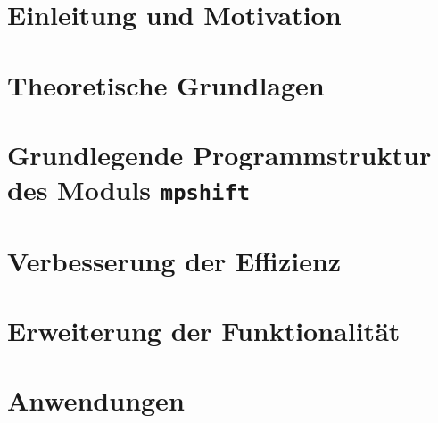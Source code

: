 \documentclass[
  paper=A4, 		%
  pagesize, 		%
  DIV=12, 		%
  ngerman,  		%
  12pt, 			%
  listof=totoc, 
  bibliography=totoc, 
  index=totoc, 
  openany, 
]{scrbook}
\begin{document}
\newcommand{\iu}{\mathrm{i}\mkern1mu}
\newcommand*\diff{\mathop{}\!\mathrm{d}}
\newcommand*\Diff[1]{\mathop{}\!\mathrm{d^#1}}

\frontmatter
 
\restoregeometry
\thispagestyle{empty}
\cleardoublepage

%  



\setcounter{secnumdepth}{5}
\setcounter{tocdepth}{5}
\tableofcontents

\mainmatter %

\chapter{Einleitung und Motivation}\label{einleitung}


\chapter{Theoretische Grundlagen}\label{theorie}


\chapter{Grundlegende Programmstruktur des Moduls \texttt{mpshift}}\label{programmstruktur}


\chapter{Verbesserung der Effizienz}\label{effizienz}


\chapter{Erweiterung der Funktionalität}\label{funktionalität}


\chapter{Anwendungen}\label{anwendungen}

\end{document}
